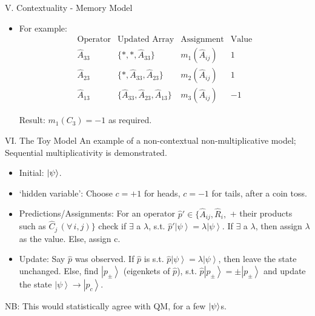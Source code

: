 \documentclass[final,hyperref={pdfpagelabels=false}]{beamer}
\begin{document}
\begin{frame}[t]
\begin{columns}[c]
\begin{column}{.69\textwidth}
\begin{columns}[b]
\begin{column}{.48\textwidth}
\begin{block}{V. Contextuality - Memory Model}
\begin{itemize}
              \item For example:
                \[
                \begin{array}{c|ccc}
                  \text{Operator} & \text{Updated Array} & \text{Assignment} & \text{Value}\\
                  \hat {A}_{33} & \{*,*,\hat{A}_{33}\} & m_1(\hat A_{ij}) & 1\\
                  \hat {A}_{23} & \{*,\hat{A}_{33},\hat{A}_{23}\} & m_2(\hat A_{ij}) & 1\\
                  \hat {A}_{13} & \{\hat{A}_{33},\hat{A}_{23},\hat {A}_{13}\} & m_3(\hat A_{ij}) & -1
                \end{array}
                \]

                Result: $m_1(C_3)=-1$ as required.
              \end{itemize}
          \end{block}

          \begin{block}{VI. The Toy Model}
            An example of a non-contextual non-multiplicative model; Sequential multiplicativity is demonstrated.
            \begin{itemize}
              \item Initial: $\ket {\psi}$.
              \item `hidden variable': Choose $c=+1$ for heads, $c=-1$ for tails, after a coin toss.
              \item Predictions/Assignments: For an operator $\hat{p}'\in\{\hat{A}_{ij},\hat{R}_{i},$ + their products such as $\hat{C}_{j}\,(\forall\,i,j)\}$  check if $\exists$ a $\lambda$, s.t. $\hat{p}'\left|\psi\right\rangle =\lambda\left|\psi\right\rangle$. If $\exists$ a $\lambda$, then assign $\lambda$ as the value. Else, assign c.
              \item Update: Say $\hat{p}$ was observed. If $\hat{p}$ is s.t. $\hat{p}\left|\psi\right\rangle =\lambda\left|\psi\right\rangle$, then leave the state unchanged. Else, find $\left|p_{\pm}\right\rangle$   (eigenkets of $\hat{p}$), s.t. $\hat{p}\left|p_{\pm}\right\rangle =\pm\left|p_{\pm}\right\rangle$ and update the state $\left|\psi\right\rangle \to\left|p_{c}\right\rangle$. 
            \end{itemize}
            NB: This would statistically agree with QM, for a few $\ket{\psi}$s.
          \end{block}


\end{column}
\end{columns}
\end{column}
\end{columns}
\end{frame}
\end{document}
